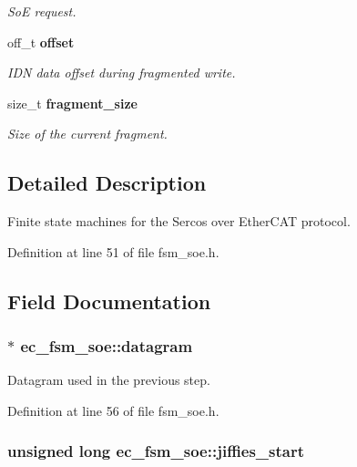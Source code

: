 \begin{DoxyCompactItemize}
\begin{DoxyCompactList}\small\item\em So\-E request. \end{DoxyCompactList}\item 
off\-\_\-t {\bf offset}
\begin{DoxyCompactList}\small\item\em I\-D\-N data offset during fragmented write. \end{DoxyCompactList}\item 
size\-\_\-t {\bf fragment\-\_\-size}
\begin{DoxyCompactList}\small\item\em Size of the current fragment. \end{DoxyCompactList}\end{DoxyCompactItemize}


\subsection{Detailed Description}
Finite state machines for the Sercos over Ether\-C\-A\-T protocol. 

Definition at line 51 of file fsm\-\_\-soe.\-h.



\subsection{Field Documentation}
\subsubsection[{datagram}]{$\ast$ ec\-\_\-fsm\-\_\-soe\-::datagram}\label{structec__fsm__soe_ad94b8e0cd3aeb06cc554b1405bf02436}


Datagram used in the previous step. 



Definition at line 56 of file fsm\-\_\-soe.\-h.

\subsubsection[{jiffies\-\_\-start}]{\setlength{\rightskip}{0pt plus 5cm}unsigned long ec\-\_\-fsm\-\_\-soe\-::jiffies\-\_\-start}\label{structec__fsm__soe_ad9dc7d3d67af743a7181a878f23faa84}


